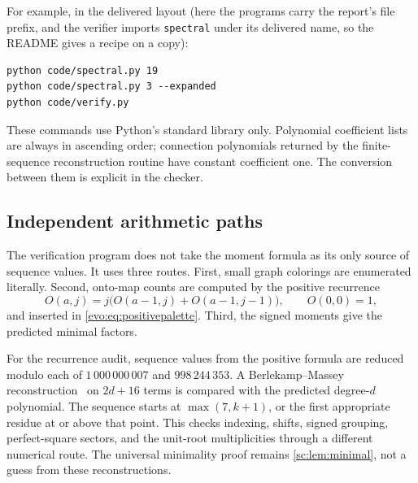 \documentclass[11pt,a4paper]{article}
\numberwithin{equation}{section}
\theoremstyle{definition}
\theoremstyle{remark}
\begin{document}
For example, in the delivered layout (here the programs carry the report's
file prefix, and the verifier imports \texttt{spectral} under its delivered
name, so the README gives a recipe on a copy):
\begin{lstlisting}
python code/spectral.py 19
python code/spectral.py 3 --expanded
python code/verify.py
\end{lstlisting}
These commands use Python's standard library only. Polynomial coefficient
lists are always in ascending order; connection polynomials returned by
the finite-sequence reconstruction routine have constant coefficient one.
The conversion between them is explicit in the checker.

\subsection{Independent arithmetic paths}
The verification program does not take the moment formula as its only
source of sequence values. It uses three routes. First, small graph
colorings are enumerated literally. Second, onto-map counts are computed
by the positive recurrence
\[
 O(a,j)=j\bigl(O(a-1,j)+O(a-1,j-1)\bigr),\qquad O(0,0)=1,
\]
and inserted in \eqref{evo:eq:positivepalette}. Third, the signed moments give the
predicted minimal factors.

For the recurrence audit, sequence values from the positive formula are
reduced modulo each of $1\,000\,000\,007$ and $998\,244\,353$. A
Berlekamp--Massey reconstruction~\cite{Massey} on $2d+16$ terms is compared
with the predicted degree-$d$ polynomial. The sequence starts at
$\max(7,k+1)$, or the first appropriate residue at or above that point.
This checks indexing, shifts, signed grouping, perfect-square sectors,
and the unit-root multiplicities through a different numerical route.
The universal minimality proof remains \cref{sc:lem:minimal}, not a guess
from these reconstructions.
\end{document}
